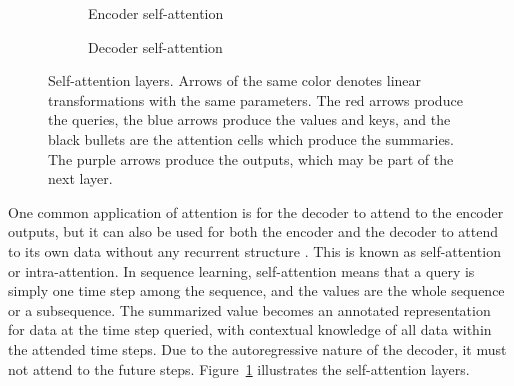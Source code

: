 \documentclass[11pt]{article}
\begin{document}
\begin{figure}
  \begin{subfigure}{0.5\textwidth}
    \centering
    \caption*{Encoder self-attention}
  \end{subfigure}%
  \begin{subfigure}{0.5\textwidth}
    \centering
    \caption*{Decoder self-attention}
  \end{subfigure}
  \caption[]{\label{fig:layer}Self-attention layers.
    Arrows of the same color denotes linear transformations with the same parameters.
    The red arrows produce the queries,
    the blue arrows produce the values and keys,
    and the black bullets are the attention cells
    which produce the summaries.
    The purple arrows produce the outputs,
    which may be part of the next layer.}
\end{figure}

One common application of attention is for the decoder to attend to the encoder outputs,
but it can also be used for both the encoder and the decoder to attend to its own data
without any recurrent structure \parencite{parikh2016decomposable}.
This is known as self-attention or intra-attention.
In sequence learning, self-attention means that a query is simply one time step among the sequence,
and the values are the whole sequence or a subsequence.
The summarized value becomes an annotated representation for data at the time step queried,
with contextual knowledge of all data within the attended time steps.
Due to the autoregressive nature of the decoder,
it must not attend to the future steps.
Figure~\ref{fig:layer} illustrates the self-attention layers.
\end{document}
